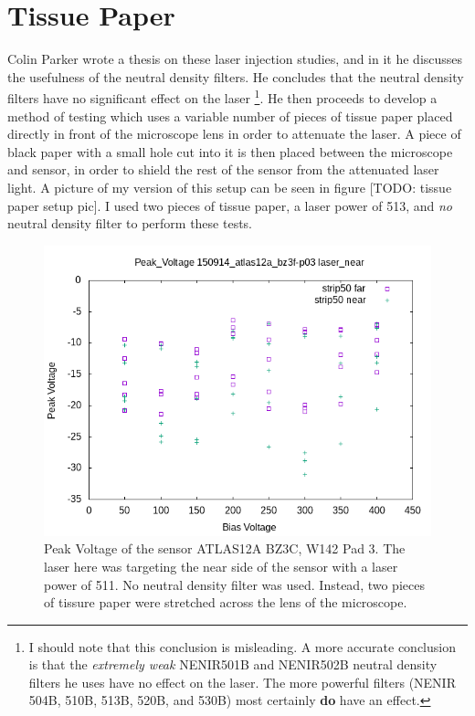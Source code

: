 \documentclass{report}
\begin{document}
        \section{Tissue Paper}
            Colin Parker wrote a thesis on these laser injection studies, and in it he discusses the usefulness of the neutral density filters. He concludes that the neutral density filters have no significant effect on the laser \footnote{I should note that this conclusion is misleading. A more accurate conclusion is that the \textit{extremely weak} NENIR501B and NENIR502B neutral density filters he uses have no effect on the laser. The more powerful filters (NENIR 504B, 510B, 513B, 520B, and 530B) most certainly \textbf{do} have an effect.}. He then proceeds to develop a method of testing which uses a variable number of pieces of tissue paper placed directly in front of the microscope lens in order to attenuate the laser. A piece of black paper with a small hole cut into it is then placed between the microscope and sensor, in order to shield the rest of the sensor from the attenuated laser light. A picture of my version of this setup can be seen in figure [TODO: tissue paper setup pic]. I used two pieces of tissue paper, a laser power of 513, and \textit{no} neutral density filter to perform these tests.

            \begin{figure}[h] 
                \includegraphics[height=.4\textheight]{Peak_Voltage__150914_atlas12a_bz3f-p03__laser_near}
                \centering
                \caption{ Peak Voltage of the sensor ATLAS12A BZ3C, W142 Pad 3. The laser here was targeting the near side of the sensor with a laser power of 511. No neutral density filter was used. Instead, two pieces of tissure paper were stretched across the lens of the microscope. }
                \label{fig:Peak_Voltage__150914_atlas12a_bz3f-p03__laser_near}
            \end{figure}
\end{document}
